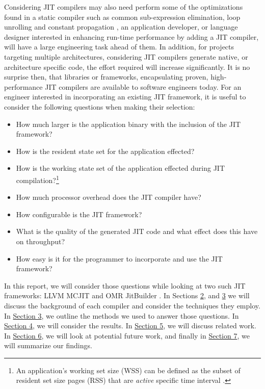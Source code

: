Considering JIT compilers may also need perform some of the optimizations found in a static compiler such as common sub-expression elimination, loop unrolling and constant propagation \cite{compilerBook}, an application developer, or language designer interested in enhancing run-time performance by adding a JIT compiler, will have a large engineering task ahead of them.
In addition, for projects targeting multiple architectures, considering JIT compilers generate native, or architecture specific code, the effort required will increase significantly.
It is no surprise then, that libraries or frameworks, encapsulating proven, high-performance JIT compilers are available to software engineers today.
For an engineer interested in incorporating an existing JIT framework, it is useful to consider the following questions when making their selection: 
\begin{itemize}
    \item How much larger is the application binary with the inclusion of the JIT framework?
    \item How is the resident state set for the application effected?
    \item How is the working state set of the application effected during JIT compilation?\footnote{
        An application's working set size (WSS) can be defined as the subset of resident set size pages (RSS) that are \textit{active}   specific time interval \cite{BgreggWSS}.
    }
    \item How much processor overhead does the JIT compiler have?
    \item How configurable is the JIT framework?
    \item What is the quality of the generated JIT code and what effect does this have on throughput?
    \item How easy is it for the programmer to incorporate and use the JIT framework?
\end{itemize} 

In this report, we will consider those questions while looking at two such JIT frameworks: LLVM MCJIT \cite{LLVM_Web} and OMR JitBuilder \cite{jitbuilderPaper}.
In Sections \hyperref[sec:llvm]{2}, and \hyperref[sec:jitbuilder]{3} we will discuss the background of each compiler and consider the techniques they employ.
In \hyperref[sec:methodology]{Section 3}, we outline the methods we used to answer those questions.
In \hyperref[sec:results]{Section 4}, we will consider the results.
In \hyperref[sec:related-work]{Section 5}, we will discuss related work.
In \hyperref[sec:future-work]{Section 6}, we will look at potential future work, and finally in \hyperref[sec:summary]{Section 7}, we will summarize our findings.